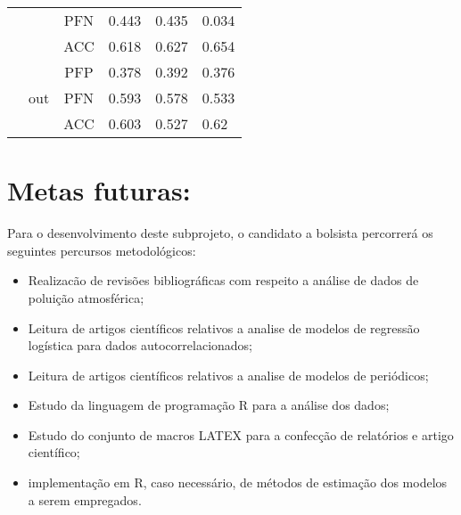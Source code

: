 \documentclass[10pt, a4paper]{article}
\begin{document}
\begin{table}[]
\begin{tabular}{ccclll}
                                                                                                                        &                           & PFN	& 0.443	    & 0.435     & 0.034     \\ 
                                                                                                                        &                           & ACC	& 0.618	    & 0.627     & 0.654     \\ \cline{2-6}
                                                                                                                        & \multirow{3}{*}{out}      & PFP	& 0.378	    & 0.392     & 0.376     \\ 
                                                                                                                        &                           & PFN	& 0.593	    & 0.578     & 0.533     \\
                                                                                                                        &                           & ACC	& 0.603	    & 0.527     & 0.62	
\end{tabular}
\end{table} 

\section*{Metas futuras:}
Para o desenvolvimento deste subprojeto, o candidato a bolsista percorrerá os seguintes percursos metodológicos:
\begin{itemize}
 \item Realizacão de revisões bibliográficas com respeito a análise de dados de poluição atmosférica;
 \item Leitura de artigos científicos relativos a analise de modelos de regressão logística para dados autocorrelacionados;
 \item Leitura de artigos científicos relativos a analise de modelos de periódicos;
 \item Estudo da linguagem de programação R \citep{R} para a análise dos dados;
 \item Estudo do conjunto de macros LATEX para a confecção de relatórios e artigo científico;
 \item implementação em R, caso necessário, de métodos de estimação dos modelos a serem empregados.
\end{itemize}



%



\end{document}
